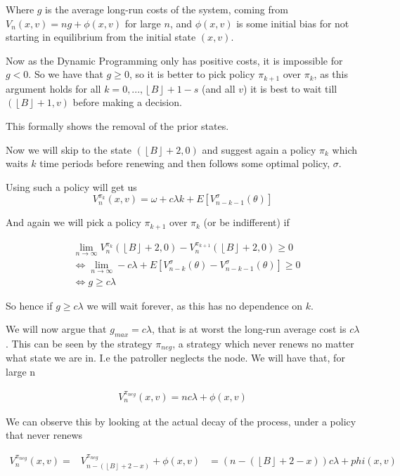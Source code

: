 \documentclass[a4paper,10pt]{article}
\newcommand{\floor}[1]{\left \lfloor #1 \right \rfloor}
\theoremstyle{definition}
\theoremstyle{definition}
\theoremstyle{remark}
\theoremstyle{definition}
\begin{document}
Where $g$ is the average long-run costs of the system, coming from $V_{n}(x,v)=ng + \phi(x,v)$ for large $n$, and $\phi(x,v)$ is some initial bias for not starting in equilibrium from the initial state $(x,v)$.

Now as the Dynamic Programming only has positive costs, it is impossible for $g < 0$. So we have that $g \geq 0$, so it is better to pick policy $\pi_{k+1}$ over $\pi_{k}$, as this argument holds for all $k=0,...,\floor{B}+1-s$ (and all $v$) it is best to wait till $(\floor{B}+1,v)$ before making a decision.

This formally shows the removal of the prior states.

Now we will skip to the state $(\floor{B}+2,0)$ and suggest again a policy $\pi_{k}$ which waits $k$ time periods before renewing and then follows some optimal policy, $\sigma$.

Using such a policy will get us
\begin{equation}
V_{n}^{\pi_{k}}(x,v)= \omega +c \lambda k + E[V_{n-k-1}^{\sigma}(\theta)]
\end{equation}

And again we will pick a policy $\pi_{k+1}$ over $\pi_{k}$ (or be indifferent) if

\begin{align*}
&\lim\limits_{n \rightarrow \infty} V_{n}^{\pi_{k}} (\floor{B}+2,0) - V_{n}^{\pi_{k+1}}(\floor{B}+2,0) \geq 0 \\
& \iff \lim\limits_{n \rightarrow \infty} -c \lambda + E[V_{n-k}^{\sigma}(\theta) - V_{n-k-1}^{\sigma}(\theta)] \geq 0 \\
& \iff g \geq c \lambda
\end{align*}

So hence if $g \geq c \lambda$ we will wait forever, as this has no dependence on $k$.

We will now argue that $g_{max}=c \lambda$, that is at worst the  long-run average cost is $c \lambda$. This can be seen by the strategy $\pi_{neg}$, a strategy which never renews no matter what state we are in. I.e the patroller neglects the node. We will have that, for large n

\begin{align*}
V_{n}^{\pi_{neg}}(x,v)=n c \lambda + \phi(x,v)
\end{align*}

We can observe this by looking at the actual decay of the process, under a policy that never renews

\begin{align*}
V_{n}^{\pi_{neg}}(x,v)=& V_{n-(\floor{B}+2-x)}^{\pi_{neg}} + \phi(x,v)
&=(n-(\floor{B}+2-x)) c \lambda + phi(x,v)
\end{align*}
\end{document}
